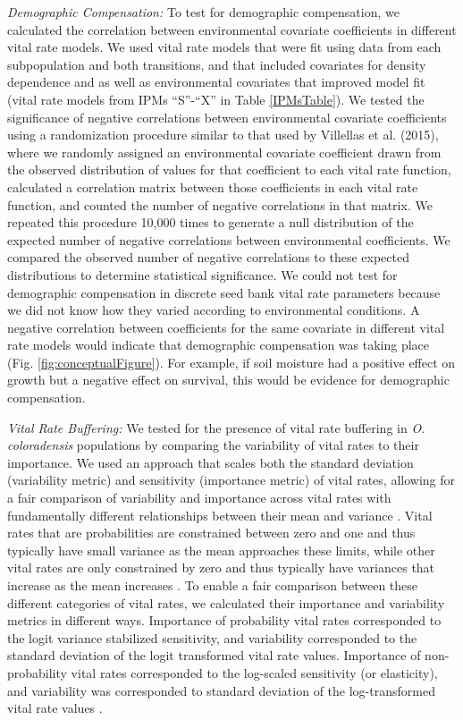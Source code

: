 \documentclass[12pt, letterpaper]{article}
\begin{document}
\textit{Demographic Compensation:} To test for demographic compensation, we calculated the correlation between environmental covariate coefficients in different vital rate models. We used vital rate models that were fit using data from each subpopulation and both transitions, and that included covariates for density dependence and as well as environmental covariates that improved model fit (vital rate models from IPMs “S”-“X” in Table \ref{IPMsTable}).  We tested the significance of negative correlations between environmental covariate coefficients using a randomization procedure similar to that used by Villellas et al. (2015), where we randomly assigned an environmental covariate coefficient drawn from the observed distribution of values for that coefficient to each vital rate function, calculated a correlation matrix between those coefficients in each vital rate function, and counted the number of negative correlations in that matrix. We repeated this procedure 10,000 times to generate a null distribution of the expected number of negative correlations between environmental coefficients. We compared the observed number of negative correlations to these expected distributions to determine statistical significance. We could not test for demographic compensation in discrete seed bank vital rate parameters because we did not know how they varied according to environmental conditions. A negative correlation between coefficients for the same covariate in different vital rate models would indicate that demographic compensation was taking place \cite{Villellas2015DemographicImplications, Dibner2019}(Fig. \ref{fig:conceptualFigure}). For example, if soil moisture had a positive effect on growth but a negative effect on survival, this would be evidence for demographic compensation.  
 
\textit{Vital Rate Buffering:} We tested for the presence of vital rate buffering in \textit{O. coloradensis} populations by comparing the variability of vital rates to their importance. We used an approach that scales both the standard deviation (variability metric) and sensitivity (importance metric) of vital rates, allowing for a fair comparison of variability and importance across vital rates with fundamentally different relationships between their mean and variance \cite{McDonald2017DivergentEnvironments}. Vital rates that are probabilities are constrained between zero and one and thus typically have small variance as the mean approaches these limits, while other vital rates are only constrained by zero and thus typically have variances that increase as the mean increases \cite{Gaillard2003-ch}. To enable a fair comparison between these different categories of vital rates, we calculated their importance and variability metrics in different ways. Importance of probability vital rates corresponded to the logit variance stabilized sensitivity, and variability corresponded to the standard deviation of the logit transformed vital rate values. Importance of non-probability vital rates corresponded to the log-scaled sensitivity (or elasticity), and variability was corresponded to standard deviation of the log-transformed vital rate values \cite{McDonald2017DivergentEnvironments, Morris2002QuantitativeAnalysis, William_A_Link_Paul_F_Doherty_Fr2002-cb}.
\end{document}

